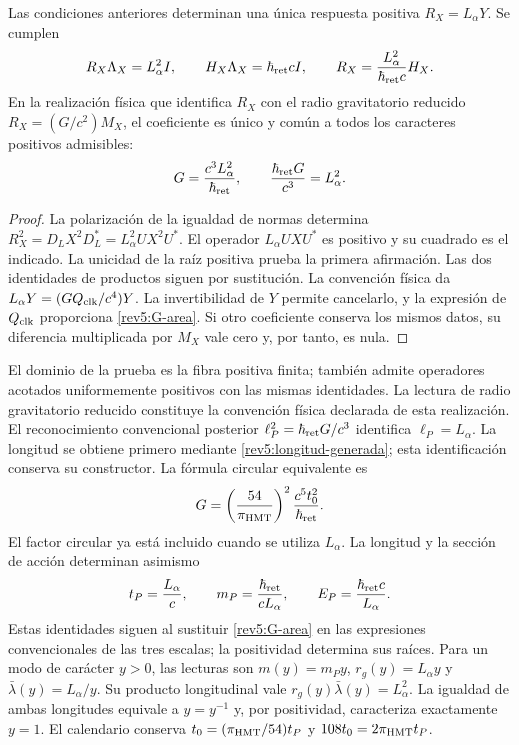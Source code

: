 \begin{theorem}
\label{rev5:rigidez-radial}
Las condiciones anteriores determinan una única respuesta positiva
\(R_X=L_\alpha Y\). Se cumplen
\begin{equation}
 R_X\Lambda_X=L_\alpha^2I,\qquad
 H_X\Lambda_X=\hbar_{\rm ret}cI,\qquad
 R_X=\frac{L_\alpha^2}{\hbar_{\rm ret}c}H_X.
\end{equation}
En la realización física que identifica \(R_X\) con el radio
gravitatorio reducido \(R_X=(G/c^2)M_X\), el coeficiente es
único y común a todos los caracteres positivos admisibles:
\begin{equation}
 G=\frac{c^3L_\alpha^2}{\hbar_{\rm ret}},\qquad
 \frac{\hbar_{\rm ret}G}{c^3}=L_\alpha^2.
 \label{rev5:G-area}
\end{equation}
\end{theorem}
\begin{proof}
La polarización de la igualdad de normas determina
\(R_X^2=D_LX^2D_L^*=L_\alpha^2UX^2U^*\).
El operador \(L_\alpha UXU^*\) es positivo y su cuadrado es
el indicado. La unicidad de la raíz positiva prueba la primera
afirmación. Las dos identidades de productos siguen por sustitución.
La convención física da
\(L_\alpha Y=(GQ_{\rm clk}/c^4)Y\). La invertibilidad
de \(Y\) permite cancelarlo, y la expresión de
\(Q_{\rm clk}\) proporciona \eqref{rev5:G-area}.
Si otro coeficiente conserva los mismos datos, su diferencia
multiplicada por \(M_X\) vale cero y, por tanto, es nula.
\end{proof}

El dominio de la prueba es la fibra positiva finita; también admite
operadores acotados uniformemente positivos con las mismas identidades.
La lectura de radio gravitatorio reducido constituye la convención
física declarada de esta realización. El reconocimiento convencional
posterior \(\ell_P^2=\hbar_{\rm ret}G/c^3\) identifica
\(\ell_P=L_\alpha\). La longitud se obtiene primero mediante
\eqref{rev5:longitud-generada}; esta identificación conserva su
constructor. La fórmula circular equivalente es
\[
 G=\left(\frac{54}{\pi_{\rm HMT}}\right)^2
 \frac{c^5t_0^2}{\hbar_{\rm ret}}.
\]
El factor circular ya está incluido cuando se utiliza \(L_\alpha\).
La longitud y la sección de acción determinan asimismo
\[
 t_P=\frac{L_\alpha}{c},\qquad
 m_P=\frac{\hbar_{\rm ret}}{cL_\alpha},\qquad
 E_P=\frac{\hbar_{\rm ret}c}{L_\alpha}.
\]
Estas identidades siguen al sustituir \eqref{rev5:G-area} en las
expresiones convencionales de las tres escalas; la positividad
determina sus raíces. Para un modo de carácter \(y>0\), las
lecturas son \(m(y)=m_Py\), \(r_g(y)=L_\alpha y\) y
\(\bar\lambda(y)=L_\alpha/y\). Su producto longitudinal
vale \(r_g(y)\bar\lambda(y)=L_\alpha^2\). La igualdad de
ambas longitudes equivale a \(y=y^{-1}\) y, por positividad,
caracteriza exactamente \(y=1\). El calendario conserva
\(t_0=(\pi_{\rm HMT}/54)t_P\) y
\(108t_0=2\pi_{\rm HMT}t_P\).

